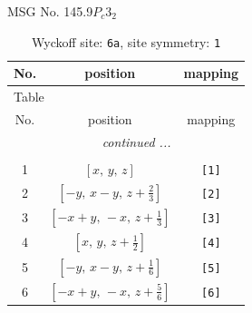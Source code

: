 \documentclass[fleqn,8pt]{jsarticle}
\begin{document}
\setcounter{MaxMatrixCols}{32}

\renewcommand{\tablename}{Table~}
\renewcommand{\figurename}{Figure~}
\begin{center}
\LARGE
MSG No. 145.9\quad$P_{c}3_{2}$
\end{center}
\renewcommand{\arraystretch}{1.2}
\begin{longtable}{ccc}
\caption{Wyckoff site: {\tt 6a}, site symmetry: {\tt 1}}
 \\
 \hline \hline
No. & position & mapping \\ \hline \endfirsthead

\multicolumn{2}{l}{\tablename\ \thetable{}} \\
 \hline \hline
No. & position & mapping \\ \hline \endhead

 \hline \hline
\multicolumn{2}{r}{\footnotesize\it continued ...} \\ \endfoot

 \hline \hline
\multicolumn{2}{r}{} \\ \endlastfoot

1 & $\left[ x,\, y,\, z \right]$ & {\tt [1]} \\ \hline
2 & $\left[ - y,\, x - y,\, z + \frac{2}{3} \right]$ & {\tt [2]} \\ \hline
3 & $\left[ - x + y,\, - x,\, z + \frac{1}{3} \right]$ & {\tt [3]} \\ \hline
4 & $\left[ x,\, y,\, z + \frac{1}{2} \right]$ & {\tt [4]} \\ \hline
5 & $\left[ - y,\, x - y,\, z + \frac{1}{6} \right]$ & {\tt [5]} \\ \hline
6 & $\left[ - x + y,\, - x,\, z + \frac{5}{6} \right]$ & {\tt [6]} \\
\end{longtable}
\end{document}
